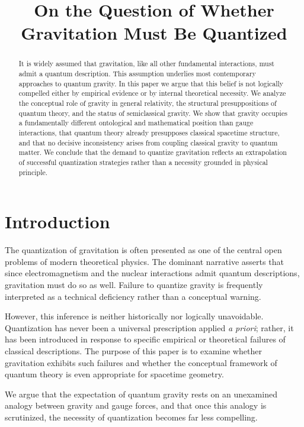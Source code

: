 \documentclass[12pt]{article}
\title{\textbf{On the Question of Whether Gravitation Must Be Quantized}}
\author{ }
\date{}
\begin{document}
\maketitle

\begin{abstract}
It is widely assumed that gravitation, like all other fundamental interactions,
    must admit a quantum description. This assumption underlies most
    contemporary approaches to quantum gravity. In this paper we argue that
    this belief is not logically compelled either by empirical evidence or by
    internal theoretical necessity. We analyze the conceptual role of gravity
    in general relativity, the structural presuppositions of quantum theory,
    and the status of semiclassical gravity. We show that gravity occupies a
    fundamentally different ontological and mathematical position than gauge
    interactions, that quantum theory already presupposes classical spacetime
    structure, and that no decisive inconsistency arises from coupling
    classical gravity to quantum matter. We conclude that the demand to
    quantize gravitation reflects an extrapolation of successful quantization
    strategies rather than a necessity grounded in physical principle.
\end{abstract}

\section{Introduction}

The quantization of gravitation is often presented as one of the central open
problems of modern theoretical physics. The dominant narrative asserts that
since electromagnetism and the nuclear interactions admit quantum descriptions,
gravitation must do so as well. Failure to quantize gravity is frequently
interpreted as a technical deficiency rather than a conceptual warning.

However, this inference is neither historically nor logically unavoidable.
Quantization has never been a universal prescription applied \emph{a priori};
rather, it has been introduced in response to specific empirical or theoretical
failures of classical descriptions. The purpose of this paper is to examine
whether gravitation exhibits such failures and whether the conceptual framework
of quantum theory is even appropriate for spacetime geometry.

We argue that the expectation of quantum gravity rests on an unexamined analogy
between gravity and gauge forces, and that once this analogy is scrutinized,
the necessity of quantization becomes far less compelling.
\end{document}
